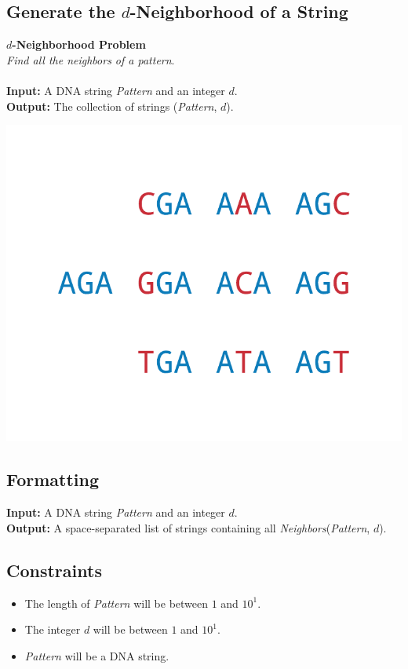 \documentclass{article}
\renewcommand{\sc}[1]{\text{\scshape #1}}
\begin{document}
\subsection{Generate the $d$-Neighborhood of a String}
\hline\vspace{5}
\noindent \textbf{$d$-Neighborhood Problem}\\
\emph{Find all the neighbors of a pattern}.\\ \\
\textbf{Input:} A DNA string \emph{Pattern} and an integer $d$.\\
\textbf{Output:} The collection of strings \sc{Neighbors}(\emph{Pattern}, $d$).
\begin{center}
    \includegraphics[scale=0.24]{c1/logos/1N.png} 
\end{center}
\hline\vspace{5}

\subsection*{Formatting}
\textbf{Input:} A DNA string \emph{Pattern} and an integer $d$.\\
\noindent \textbf{Output:} A space-separated list of strings containing all \emph{Neighbors}(\emph{Pattern}, $d$).

\subsection*{Constraints}
\begin{itemize}
    \item The length of \emph{Pattern} will be between $1$ and $10^1$.
    \item The integer $d$ will be between $1$ and $10^1$.
    \item \emph{Pattern} will be a DNA string.
\end{itemize}
\pagebreak
\end{document}
